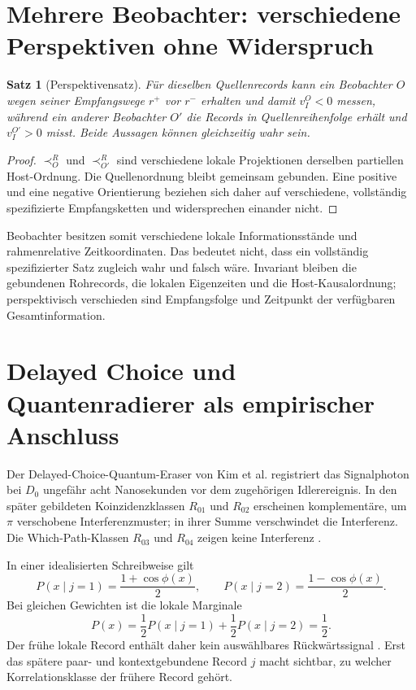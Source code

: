 \documentclass[11pt,a4paper]{article}
\newtheorem{satz}{Satz}[section]
\theoremstyle{remark}
\newcommand{\recv}{\prec_{\!O}^{R}}
\begin{document}
\section{Mehrere Beobachter: verschiedene Perspektiven ohne Widerspruch}

\begin{satz}[Perspektivensatz]
Für dieselben Quellenrecords kann ein Beobachter \(O\) wegen seiner
Empfangswege \(r^+\) vor \(r^-\) erhalten und damit \(v_I^O<0\) messen,
während ein anderer Beobachter \(O'\) die Records in Quellenreihenfolge erhält
und \(v_I^{O'}>0\) misst. Beide Aussagen können gleichzeitig wahr sein.
\end{satz}

\begin{proof}
\(\recv\) und \(\prec_{O'}^R\) sind verschiedene lokale Projektionen
derselben partiellen Host-Ordnung. Die Quellenordnung bleibt gemeinsam
gebunden. Eine positive und eine negative Orientierung beziehen sich daher
auf verschiedene, vollständig spezifizierte Empfangsketten und widersprechen
einander nicht.
\end{proof}

Beobachter besitzen somit verschiedene lokale Informationsstände und
rahmenrelative Zeitkoordinaten. Das bedeutet nicht, dass ein vollständig
spezifizierter Satz zugleich wahr und falsch wäre. Invariant bleiben die
gebundenen Rohrecords, die lokalen Eigenzeiten und die Host-Kausalordnung;
perspektivisch verschieden sind Empfangsfolge und Zeitpunkt der verfügbaren
Gesamtinformation.

\section{Delayed Choice und Quantenradierer als empirischer Anschluss}
\label{sec:quantum}

Der Delayed-Choice-Quantum-Eraser von Kim et al. registriert das Signalphoton
bei \(D_0\) ungefähr acht Nanosekunden vor dem zugehörigen Idlerereignis. In
den später gebildeten Koinzidenzklassen \(R_{01}\) und \(R_{02}\) erscheinen
komplementäre, um \(\pi\) verschobene Interferenzmuster; in ihrer Summe
verschwindet die Interferenz. Die Which-Path-Klassen \(R_{03}\) und
\(R_{04}\) zeigen keine Interferenz \cite{ScullyDruehl1982,Kim2000}.

In einer idealisierten Schreibweise gilt
\[
  P(x\mid j=1)=\frac{1+\cos\phi(x)}{2},\qquad
  P(x\mid j=2)=\frac{1-\cos\phi(x)}{2}.
\]
Bei gleichen Gewichten ist die lokale Marginale
\[
  P(x)=\frac12P(x\mid j=1)+\frac12P(x\mid j=2)=\frac12.
\]
Der frühe lokale Record enthält daher kein auswählbares Rückwärtssignal
\cite{Jordan1983}. Erst
das spätere paar- und kontextgebundene Record \(j\) macht sichtbar, zu welcher
Korrelationsklasse der frühere Record gehört.
\end{document}
